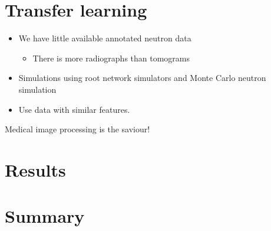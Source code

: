 \documentclass[letterpaper,10pt,english]{sphinxmanual}
\begin{document}
\section{Transfer learning}
\label{\detokenize{ML4NeutronImageSegmentation:id1}}\begin{itemize}
\item {} 
We have little available annotated neutron data
\begin{itemize}
\item {} 
There is more radiographs than tomograms

\end{itemize}

\end{itemize}

\begin{itemize}
\item {} 
Simulations using root network simulators and Monte Carlo neutron simulation

\item {} 
Use data with similar features.

\end{itemize}

Medical image processing is the saviour!


\section{Results}
\label{\detokenize{ML4NeutronImageSegmentation:results}}

\section{Summary}
\label{\detokenize{ML4NeutronImageSegmentation:summary}}
\end{document}
